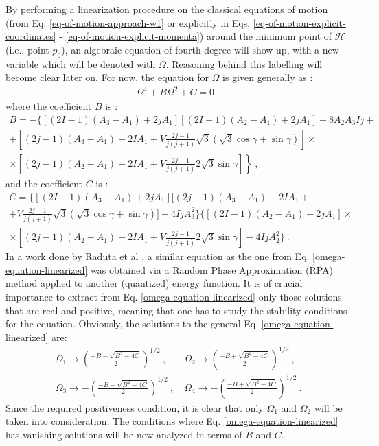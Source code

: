 By performing a linearization procedure on the classical equations of motion (from Eq. \ref{eq-of-motion-approach-w1} or explicitly in Eqs. \ref{eq-of-motion-explicit-coordinates} - \ref{eq-of-motion-explicit-momenta}) around the minimum point of $\mathcal{H}$ (i.e., point $p_0$), an algebraic equation of fourth degree will show up, with a new variable which will be denoted with $\Omega$. Reasoning behind this labelling will become clear later on. For now, the equation for $\Omega$ is given generally as \cite{raduta2020towards}:
\begin{align}
    \Omega^4+B\Omega^2+C=0\ ,
    \label{omega-equation-linearized}
\end{align}
where the coefficient $B$ is \cite{raduta2020approach}:
\begin{multline}
    B=-\bigg\{\left[ (2I-1)(A_3-A_1)+2jA_1\right]\left[(2I-1)(A_2-A_1)+2jA_1\right]+8A_2A_3Ij+\\
    +\left[(2j-1)(A_3-A_1)+2IA_1+V\frac{2j-1}{j(j+1)}\sqrt{3}\left(\sqrt{3}\cos\gamma+\sin\gamma\right)\right]\times\\
    \left.\times\left[(2j-1)(A_2-A_1)+2IA_1+V\frac{2j-1}{j(j+1)}2\sqrt{3}\sin\gamma\right]\right\}\ ,
    \label{omega-B-term}
\end{multline}
and the coefficient $C$ is \cite{raduta2020approach}:
\begin{multline}
    C=\bigg\{\left[(2I-1)(A_3-A_1)+2jA_1\right]\bigg[(2j-1)(A_3-A_1)+2IA_1+\\
    +V\frac{2j-1}{j(j+1)}\sqrt{3}(\sqrt{3}\cos\gamma+\sin\gamma)\bigg]-4IjA_3^2\bigg\}\bigg\{\left[(2I-1)(A_2-A_1)+2jA_1\right]\times\\
    \times\left[(2j-1)(A_2-A_1)+2IA_1+V\frac{2j-1}{j(j+1)}2\sqrt{3}\sin\gamma\right]-4IjA_2^2\bigg\}\ .
    \label{omega-C-term}
\end{multline}
In a work done by Raduta et al \cite{raduta2017semiclassical}, a similar equation as the one from Eq. \ref{omega-equation-linearized} was obtained via a Random Phase Approximation (RPA) method applied to another (quantized) energy function. It is of crucial importance to extract from Eq. \ref{omega-equation-linearized} only those solutions that are real and positive, meaning that one has to study the stability conditions for the equation. Obviously, the solutions to the general Eq. \ref{omega-equation-linearized} are:
\begin{align}
    \Omega_1 \to \left(\frac{-B-\sqrt{B^2-4 C}}{2}\right)^{1/2}\ ,&\ \Omega_2 \to \left(\frac{-B+\sqrt{B^2-4 C}}{2}\right)^{1/2}\ ,\nonumber\\
    \Omega_3 \to -\left(\frac{-B-\sqrt{B^2-4 C}}{2}\right)^{1/2}\ ,&\ \Omega_4 \to -\left(\frac{-B+\sqrt{B^2-4 C}}{2}\right)^{1/2}\ .
    \label{omega-1-2-3-4-solutions}
\end{align}
Since the required positiveness condition, it is clear that only $\Omega_1$ and $\Omega_2$ will be taken into consideration. The conditions where Eq. \ref{omega-equation-linearized} has vanishing solutions will be now analyzed in terms of $B$ and $C$.

